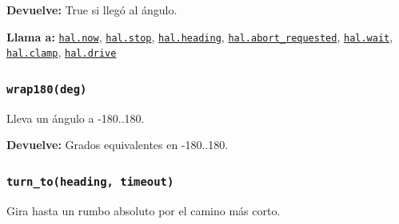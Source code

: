 \par{}\par\smallskip
\noindent\textbf{Devuelve:} True si llegó al ángulo.\par
\noindent\textbf{Llama a:} \hyperref[fn:hal:now]{\texttt{hal.now}}, \hyperref[fn:hal:stop]{\texttt{hal.stop}}, \hyperref[fn:hal:heading]{\texttt{hal.heading}}, \hyperref[fn:hal:abort-requested]{\texttt{hal.abort\_\allowbreak{}requested}}, \hyperref[fn:hal:wait]{\texttt{hal.wait}}, \hyperref[fn:hal:clamp]{\texttt{hal.clamp}}, \hyperref[fn:hal:drive]{\texttt{hal.drive}}\par

\subsubsection{\texttt{wrap180(deg)}}\label{fn:motion:wrap180}
\noindent Lleva un ángulo a -180..180.

\par{}\par\smallskip
\noindent\textbf{Devuelve:} Grados equivalentes en -180..180.\par

\subsubsection{\texttt{turn\_\allowbreak{}to(heading, timeout)}}\label{fn:motion:turn-to}
\noindent Gira hasta un rumbo absoluto por el camino más corto.


